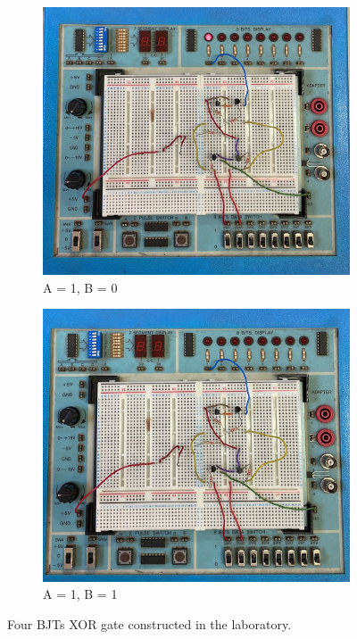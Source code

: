 \begin{figure}[H]
        \vspace{1cm} %

        \begin{subfigure}{0.45\textwidth}
            \centering
            \includegraphics[width=\linewidth]{figures/photos/XOR/10.png}
            \caption{A = 1, B = 0}
        \end{subfigure}
        \hfill
        \begin{subfigure}{0.45\textwidth}
            \centering
            \includegraphics[width=\linewidth]{figures/photos/XOR/11.png}
            \caption{A = 1, B = 1}
        \end{subfigure}

        \caption{Four BJTs XOR gate constructed in the laboratory.}
        \label{fig:XOR_photos}
    \end{figure}

